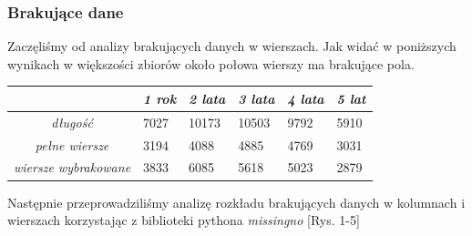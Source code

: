 \documentclass[11pt]{article}
\begin{document}
\subsubsection{Brakujące dane}
Zaczęliśmy od analizy brakujących danych w wierszach. Jak widać w poniższych wynikach w większości zbiorów około połowa wierszy ma brakujące pola.
\begin{center}
\begin{tabular}{|c|m{0.7in}|m{0.7in}|m{0.7in}|m{0.7in}|m{0.7in}|}
	\hline
	& \textit{1 rok} & \textit{2 lata} & \textit{3 lata} & \textit{4 lata} & \textit{5 lat} \\ \hline
	\textit{długość} & 7027 & 10173 & 10503 & 9792 & 5910 \\ \hline
	\textit{pełne wiersze} & 3194 & 4088 & 4885 & 4769 & 3031 \\ \hline
	\textit{wiersze wybrakowane} & 3833 & 6085 & 5618 & 5023 & 2879 \\ \hline
\end{tabular}
\end{center}
Następnie przeprowadziliśmy analizę rozkładu brakujących danych w kolumnach i wierszach korzystając z biblioteki pythona \textit{missingno} [Rys. 1-5]\\
\end{document}
